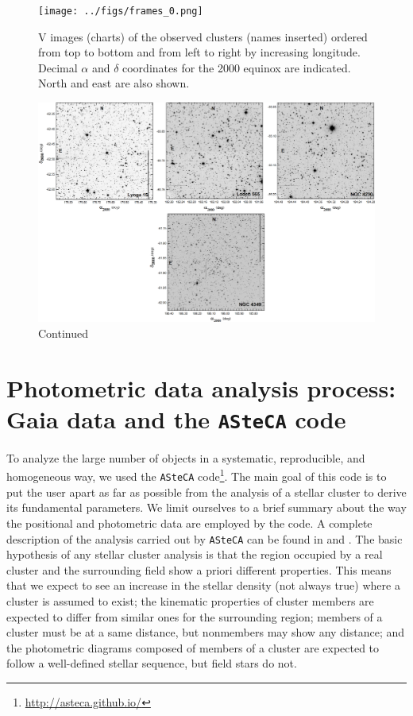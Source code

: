 \documentclass[draft]{aa}
\begin{document}
\begin{figure}[htp]
    \centering
     \texttt{[image: ../figs/frames\_0.png]}   
\caption{V images (charts) of the observed clusters (names inserted)
ordered from top to bottom and from left to right by increasing 
longitude. Decimal $\alpha$ and $\delta$ coordinates for the 2000 equinox are
indicated. North and east are also shown.}
    \label{fig:Vim}
\end{figure}

\begin{figure}[htp]
    \addtocounter{figure}{-1}
    \centering
    \includegraphics[width=1\hsize]{../figs/frames_1.png}
    \caption{Continued}
    \label{fig:Vim2}
\end{figure}





\section{Photometric data analysis process: Gaia data and the \texttt{ASteCA}
code}
\label{sec:photom_analysis}

To analyze the large number of objects in a systematic, reproducible, and
homogeneous way, we used the \texttt{ASteCA}
code\footnote{\url{http://asteca.github.io/}}. The main goal of this code is to
put the user apart as far as possible from the analysis of a stellar cluster
to derive its fundamental parameters. We limit ourselves to a brief
summary about the way the positional and photometric data are employed by the
code. A complete description of the analysis carried out by
\texttt{ASteCA} can be found in \cite{Perren_2015} and \cite{Perren_2017}.
%
The basic hypothesis of any stellar cluster analysis is that the
region occupied by a real cluster and the surrounding field show a
priori different properties.
This means that we expect to see an increase in the stellar density  (not always true) where
a cluster is assumed to exist; the kinematic properties of cluster members
are expected to differ from similar ones for the surrounding region; members of a
cluster must be at a same distance, but nonmembers may show any
distance; and the photometric diagrams composed of members of a cluster are expected to
follow a well-defined stellar sequence, but field stars do not. 
\end{document}
